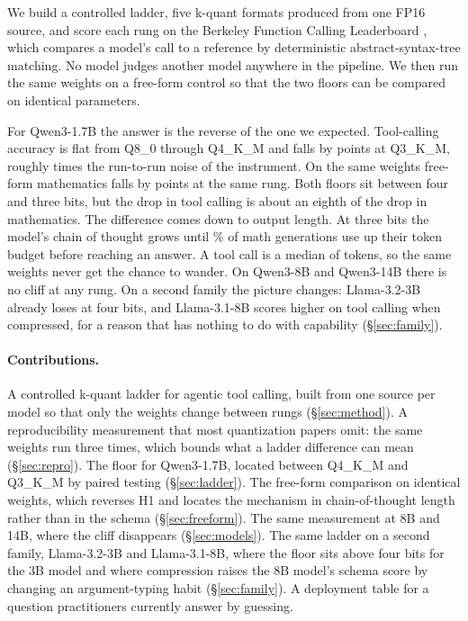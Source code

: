 \documentclass[10pt]{article}
\newcommand{\qm}{Qwen3-1.7B}
\begin{document}
We build a controlled ladder, five k-quant formats produced from one FP16 source, and score each rung on the Berkeley Function Calling Leaderboard \citep{bfcl2025}, which compares a model's call to a reference by deterministic abstract-syntax-tree matching. No model judges another model anywhere in the pipeline. We then run the same weights on a free-form control so that the two floors can be compared on identical parameters.

For \qm{} the answer is the reverse of the one we expected. Tool-calling accuracy is flat from Q8\_0 through Q4\_K\_M and falls by \qtDropThree{} points at Q3\_K\_M, roughly \qtCliffOverNoise{} times the run-to-run noise of the instrument. On the same weights free-form mathematics falls by \qtGsmDropThree{} points at the same rung. Both floors sit between four and three bits, but the drop in tool calling is about an eighth of the drop in mathematics. The difference comes down to output length. At three bits the model's chain of thought \citep{wei2022cot} grows until \qtGsmTruncPctThree{}\% of math generations use up their token budget before reaching an answer. A tool call is a median of \qtToolNgenMedThree{} tokens, so the same weights never get the chance to wander. On Qwen3-8B and Qwen3-14B there is no cliff at any rung. On a second family the picture changes: Llama-3.2-3B already loses at four bits, and Llama-3.1-8B scores higher on tool calling when compressed, for a reason that has nothing to do with capability (\S\ref{sec:family}).

\paragraph{Contributions.} A controlled k-quant ladder for agentic tool calling, built from one source per model so that only the weights change between rungs (\S\ref{sec:method}). A reproducibility measurement that most quantization papers omit: the same weights run three times, which bounds what a ladder difference can mean (\S\ref{sec:repro}). The floor for \qm{}, located between Q4\_K\_M and Q3\_K\_M by paired testing (\S\ref{sec:ladder}). The free-form comparison on identical weights, which reverses H1 and locates the mechanism in chain-of-thought length rather than in the schema (\S\ref{sec:freeform}). The same measurement at 8B and 14B, where the cliff disappears (\S\ref{sec:models}). The same ladder on a second family, Llama-3.2-3B and Llama-3.1-8B, where the floor sits above four bits for the 3B model and where compression raises the 8B model's schema score by changing an argument-typing habit (\S\ref{sec:family}). A deployment table for a question practitioners currently answer by guessing.
\end{document}

